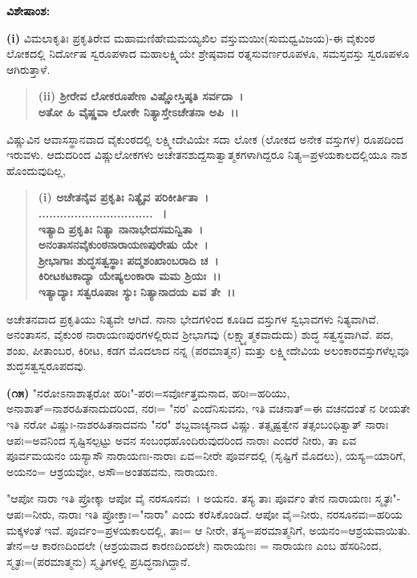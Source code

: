 \noindent
\textbf{ವಿಶೇಷಾಂಶ:\enginline{-}}

\textbf{(i)} ವಿಮಲಾಕೃತಿಃ ಪ್ರಕೃತಿರೇವ ಮಹಾಮಣಿಹೇಮಮಯ್ಯಖಿಲ ವಸ್ತುಮಯೀ\break (ಸುಮಧ್ವವಿಜಯ)-ಈ ವೈಕುಂಠ ಲೋಕದಲ್ಲಿ ನಿರ್ದೋಷ ಸ್ವರೂಪಳಾದ ಮಹಾಲಕ್ಷ್ಮಿಯೇ ಶ್ರೇಷ್ಠವಾದ ರತ್ನಸುವರ್ಣರೂಪಳೂ, ಸಮಸ್ತವಸ್ತು ಸ್ವರೂಪಳೂ ಆಗಿರುತ್ತಾಳೆ.

\begin{verse}
\textbf{(ii) ಶ‍್ರೀರೇವ ಲೋಕರೂಪೇಣ ವಿಷ್ಣೋಸ್ತಿಷ್ಠತಿ ಸರ್ವದಾ~।}\\\textbf{ಅತೋ ಹಿ ವೈಷ್ಣವಾ ಲೋಕೇ ನಿತ್ಯಾಸ್ತೇಽಚೇತನಾ ಅಪಿ~।।}
\end{verse}


ವಿಷ್ಣುವಿನ ಆವಾಸಸ್ಥಾನವಾದ ವೈಕುಂಠದಲ್ಲಿ ಲಕ್ಷ್ಮೀದೇವಿಯೇ ಸದಾ ಲೋಕ (ಲೋಕದ ಅನೇಕ ವಸ್ತುಗಳ) ರೂಪದಿಂದ ಇರುವಳು. ಆದುದರಿಂದ ವಿಷ್ಣುಲೋಕಗಳು ಅಚೇತನಶುದ್ದಸಾತ್ವಾತ್ಮಕಗಳಾಗಿದ್ದರೂ ನಿತ್ಯ=ಪ್ರಳಯಕಾಲದಲ್ಲಿಯೂ ನಾಶ ಹೊಂದುವುದಿಲ್ಲ,

\begin{verse}
\textbf{(i) ಅಚೇತನೈವ ಪ್ರಕೃತಿಃ ನಿತ್ಯೈವ ಪರಿಕೀರ್ತಿತಾ~।}\\\textbf{................................~।}\\\textbf{ಇತ್ಯಾದಿ ಪ್ರಕೃತಿಃ ನಿತ್ಯಾ ನಾನಾಭೇದಸಮನ್ವಿತಾ~।}\\\textbf{ಅನಂತಾಸನವೈಕುಂಠನಾರಾಯಣಪುರೇಷು ಯೇ~।}\\\textbf{ಶ‍್ರೀಭಾಗಾಃ ಶುದ್ಧಸತ್ವಸ್ಥಾಃ ಪದ್ಮಶಂಖಾಂಬರಾದಿ ಚ~।}\\\textbf{ಕಿರೀಟಕಟಕಾದ್ಯಾ ಯೇಷ್ಯಲಂಕಾರಾ ಮಮ ಶ್ರಿಯಃ~।।}\\\textbf{ಇತ್ಯಾದ್ಯಾಃ ಸತ್ವರೂಪಾಃ ಸ್ಯುಃ ನಿತ್ಯಾನಾದಯ ಏವ ತೇ~।।}
\end{verse}


\noindent
ಅಚೇತನವಾದ ಪ್ರಕೃತಿಯು ನಿತ್ಯವೇ ಆಗಿದೆ. ನಾನಾ ಭೇದಗಳಿಂದ ಕೂಡಿದ ವಸ್ತುಗಳ ಸ್ವಭಾವಗಳು ನಿತ್ಯವಾಗಿವೆ. ಅನಂತಾಸನ, ವೈಕುಂಠ ನಾರಾಯಣಪುರಗಳಲ್ಲಿರುವ ಶ‍್ರೀಭಾಗವು (ಲಕ್ಷ್ಮ್ಯಾತ್ಮಕವಾದುದು) ಶುದ್ಧ ಸತ್ವಸ್ಥವಾಗಿವೆ. ಪದ, ಶಂಖ, ಪೀತಾಂಬರ, ಕಿರೀಟ, ಕಡಗ ಮೊದಲಾದ ನನ್ನ (ಪರಮಾತ್ಮನ) ಮತ್ತು ಲಕ್ಷ್ಮೀದೇವಿಯ ಅಲಂಕಾರವಸ್ತುಗಳೆಲ್ಲವೂ ಶುದ್ಧಸತ್ವಸ್ವರೂಪದವು.

\textbf{(೧೫)} "ನರೋಽನಾಶಾತ್ಪರೋ ಹರಿಃ"-ಪರಃ=ಸರ್ವೋತ್ತಮನಾದ, ಹರಿಃ=ಹರಿಯು, ಅನಾಶಾತ್=ನಾಶರಹಿತನಾದುದರಿಂದ, ನರಃ= "ನರ' ಎಂದೆನಿಸುವನು, ಇತಿ ವಚನಾತ್=ಈ ವಚನದಂತೆ ನ ರೀಯತೇ ಇತಿ ನರೋ ವಿಷ್ಣುಃ-ನಾಶರಹಿತನಾದವನು "ನರ" ಶಬ್ದವಾಚ್ಯನಾದ ವಿಷ್ಣು. ತತ್ಸೃಷ್ಟತ್ವೇನ ತತ್ಸಂಬಂಧಿತ್ವಾತ್ ನಾರಾಃ ಆಪಃ=ಅವನಿಂದ ಸೃಷ್ಟಿಸಲ್ಪಟ್ಟು ಅವನ ಸಂಬಂಧಹೊಂದಿರುವುದರಿಂದ ನಾರಾಃ ಎಂದರೆ ನೀರು, ತಾ ಏವ ಪೂರ್ವಮಯನಂ ಯಸ್ಯಾಸೌ ನಾರಾಯಣಃ-ನಾರಾಃ ಏವ=ನೀರೇ ಪೂರ್ವದಲ್ಲಿ (ಸೃಷ್ಟಿಗೆ ಮೊದಲು), ಯಸ್ಯ=ಯಾರಿಗೆ, ಅಯನಂ= ಆಶ್ರಯವೋ, ಅಸೌ=ಅಂತಹವನು, ನಾರಾಯಣ.

"ಆಪೋ ನಾರಾ ಇತಿ ಪ್ರೋಕ್ಕಾ ಆಪೋ ವೈ ನರಸೂನವಃ~। ಅಯನಂ. ತಸ್ಯ ತಾಃ ಪೂರ್ವಂ ತೇನ ನಾರಾಯಣಃ ಸ್ಮೃತಃ"-ಆಪಃ=ನೀರು, ನಾರಾಃ ಇತಿ ಪ್ರೋಕ್ತಾಃ="ನಾರಾ" ಎಂದು ಕರೆಸಿಕೊಂಡಿದೆ. ಆಪೋ ವೈ=ನೀರು, ನರಸೂನವಃ=ಹರಿಯ ಮಕ್ಕಳಂತೆ ಇವೆ. ಪೂರ್ವಂ=ಪ್ರಳಯಕಾಲದಲ್ಲಿ, ತಾಃ= ಆ ನೀರೇ, ತಸ್ಯ=ಪರಮಾತ್ಮನಿಗೆ, ಅಯನಂ=ಆಶ್ರಯ\-ವಾಯಿತು. ತೇನ=ಆ ಕಾರಣದಿಂದಲೇ (ಆಶ್ರಯವಾದ ಕಾರಣದಿಂದಲೇ) ನಾರಾಯಣಃ = ನಾರಾಯಣ ಎಂಬ ಹೆಸರಿನಿಂದ, ಸ್ಮೃತಃ=(ಪರಮಾತ್ಮನು) ಸ್ಮೃತಿಗಳಲ್ಲಿ ಪ್ರಸಿದ್ಧನಾಗಿದ್ದಾನೆ.

